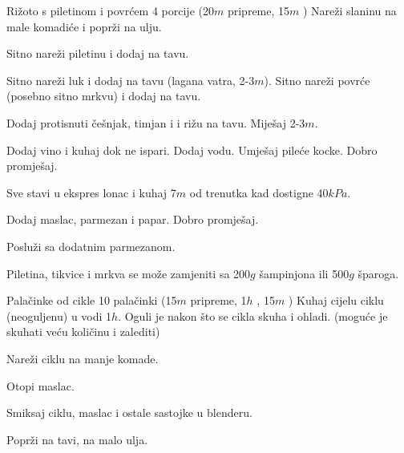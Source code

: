 \documentclass[a4paper]{article}
\begin{document}
\begin{recipe}{Rižoto s piletinom i povrćem}%
  {4 porcije}%
  { (20$m$ pripreme, 15$m$ \pot)}
  Nareži slaninu na male komadiće i poprži na ulju.

  Sitno nareži piletinu i dodaj na tavu.

  Sitno nareži luk i dodaj na tavu (lagana vatra, 2-3$m$). Sitno nareži povrće
  (posebno sitno mrkvu) i dodaj na tavu.

  Dodaj protisnuti češnjak, timjan i i rižu na tavu. Miješaj 2-3$m$.

  Dodaj vino i kuhaj dok ne ispari. Dodaj vodu. Umješaj pileće kocke. Dobro
  promješaj.

\ingredient[]{}{\pot}
  Sve stavi u ekspres lonac i kuhaj 7$m$ od trenutka kad dostigne 40$kPa$.

  Dodaj maslac, parmezan i papar. Dobro promješaj.

  Posluži sa dodatnim parmezanom.

\freeform
   Piletina, tikvice i mrkva se može zamjeniti sa 200$g$ šampinjona
  ili 500$g$ šparoga.

\end{recipe}

\begin{recipe}{Palačinke od cikle}%
  {10 palačinki}%
  { (15$m$ pripreme, 1$h$ \pot, 15$m$ \fryingpan ) \textleaf}
  Kuhaj cijelu ciklu (neoguljenu) u vodi 1$h$. Oguli je nakon što se cikla
  skuha i ohladi. (moguće je skuhati veću količinu i zalediti)

  Nareži ciklu na manje komade.

  Otopi maslac.

  Smiksaj ciklu, maslac i ostale sastojke u blenderu.

\ingredient[]{}{\fryingpan}
  Poprži na tavi, na malo ulja.

\end{recipe}
\end{document}
